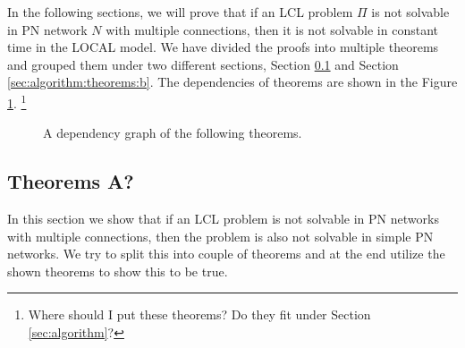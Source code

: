 
In the following sections, we will prove that if an LCL problem $\Pi$ is not solvable in PN network $N$ with multiple connections, then it is not solvable in constant time in the LOCAL model.
We have divided the proofs into multiple theorems and grouped them under two different sections, Section \ref{sec:algorithm:theorems:a} and Section \ref{sec:algorithm:theorems:b}.
The dependencies of theorems are shown in the Figure \ref{fig:algorithm:theorem_dependency}.
\footnote{Where should I put these theorems? Do they fit under Section \ref{sec:algorithm}?}

\begin{figure}[H]
    \centering
    \caption{A dependency graph of the following theorems.\label{fig:algorithm:theorem_dependency}}
\end{figure}

\subsection{Theorems A?} \label{sec:algorithm:theorems:a}
In this section we show that if an LCL problem is not solvable in PN networks with multiple connections, then the problem is also not solvable in simple PN networks.
We try to split this into couple of theorems and at the end utilize the shown theorems to show this to be true.

